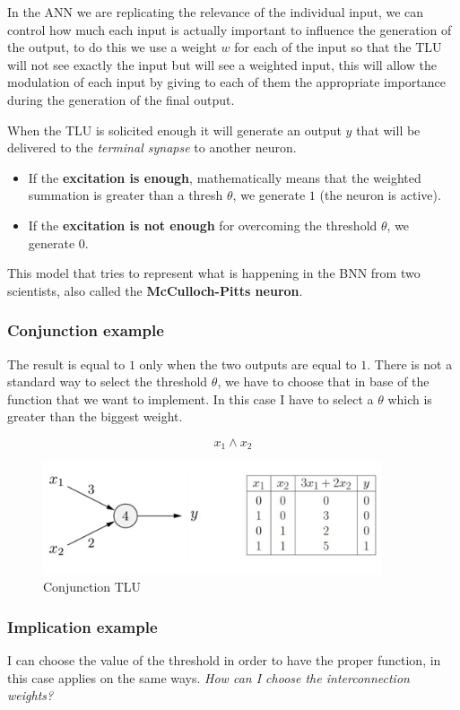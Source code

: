 \documentclass{article}
\begin{document}
In the ANN we are replicating the relevance of the individual input, we can control how much each input is actually
important to influence the generation of the output, to do this we use a weight $w$ for each of the input so
that the TLU will not see exactly the input but will see a weighted input, this will allow the modulation of
each input by giving to each of them the appropriate importance during the generation of the final output.

When the TLU is solicited enough it will generate an output $y$ that will be delivered to the \textit{terminal synapse}
to another neuron.
\begin{itemize}
    \item If the \textbf{excitation is enough}, mathematically means that the weighted summation is greater
          than a thresh $\theta$, we generate $1$ (the neuron is active).
    \item If the \textbf{excitation is not enough} for overcoming the threshold $\theta$, we generate $0$.
\end{itemize}

This model that tries to represent what is happening in the BNN from two scientists, also called the \textbf{McCulloch-Pitts neuron}.
\subsubsection{Conjunction example}
The result is equal to $1$ only when the two outputs are equal to $1$.
There is not a standard way to select the threshold $\theta$, we have to choose that in base of the
function that we want to implement. In this case I have to select a $\theta$ which is greater than the biggest weight.

$$x_1\land x_2$$

\begin{figure}[H]
    \centering
    \includegraphics[width=10cm]{images/conj_TLU.png}
    \caption{Conjunction TLU}
    \label{fig:tlu_conjunction}
\end{figure}

\subsubsection{Implication example}
I can choose the value of the threshold in order to have the proper function, in this case applies on the same ways.
\textit{How can I choose the interconnection weights?}
\end{document}
